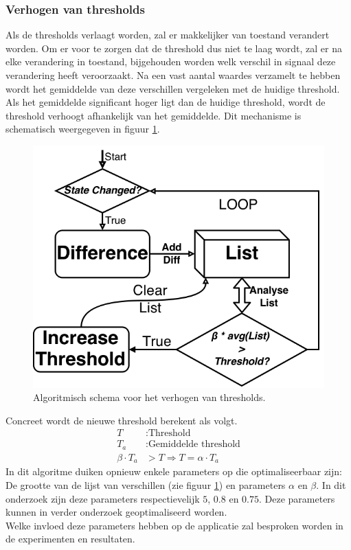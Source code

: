 \documentclass{article}
\newcommand{\figwidth}{0.82\linewidth}
\begin{document}
\subsubsection*{Verhogen van thresholds}\label{sec:verhogenthres}
Als de thresholds verlaagt worden, zal er makkelijker van toestand verandert worden. Om er voor te zorgen dat de threshold dus niet te laag wordt, zal er na elke verandering in toestand, bijgehouden worden welk verschil in signaal deze verandering heeft veroorzaakt. Na een vast aantal waardes verzamelt te hebben wordt het gemiddelde van deze verschillen vergeleken met de huidige threshold. Als het gemiddelde significant hoger ligt dan de huidige threshold, wordt de threshold verhoogt afhankelijk van het gemiddelde. Dit mechanisme is schematisch weergegeven in figuur \ref{fig:algothresholdup}.\\
\begin{figure}[H]
	\centering
	\includegraphics[width=\figwidth]{images/thresholdtrainerup_bw}
	\caption{Algoritmisch schema voor het verhogen van thresholds.}
	\label{fig:algothresholdup}
\end{figure}
Concreet wordt de nieuwe threshold berekent als volgt.
\begin{align*}
	T&: \text{Threshold}\\
	T_a&: \text{Gemiddelde threshold}\\
	\beta \cdot T_a &> T \Rightarrow T = \alpha \cdot T_a
\end{align*}
In dit algoritme duiken opnieuw enkele parameters op die optimaliseerbaar zijn: De grootte van de lijst van verschillen (zie figuur \ref{fig:algothresholdup}) en parameters $\alpha$ en $\beta$. In dit onderzoek zijn deze parameters respectievelijk $5$, $0.8$ en $0.75$. Deze parameters kunnen in verder onderzoek geoptimaliseerd worden.\\ Welke invloed deze parameters hebben op de applicatie zal besproken worden in de experimenten en resultaten.
\end{document}
